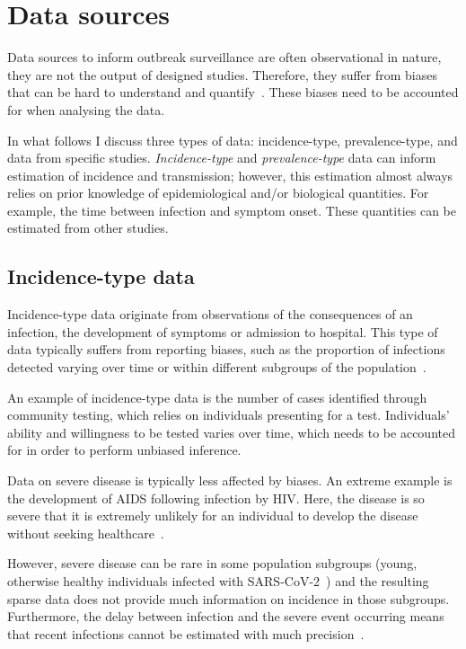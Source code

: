 \documentclass[thesis.tex]{subfiles}
\begin{document}
\section{Data sources}

Data sources to inform outbreak surveillance are often observational in nature, \ie they are not the output of designed studies.
Therefore, they suffer from biases that can be hard to understand and quantify~\autocite{shadboltChallenges}.
These biases need to be accounted for when analysing the data.

In what follows I discuss three types of data: incidence-type, prevalence-type, and data from specific studies.
\emph{Incidence-type} and \emph{prevalence-type} data can inform estimation of incidence and transmission; however, this estimation almost always relies on prior knowledge of epidemiological and/or biological quantities.
For example, the time between infection and symptom onset.
These quantities can be estimated from other studies.

\subsection{Incidence-type data}

Incidence-type data originate from observations of the consequences of an infection, \eg the development of symptoms or admission to hospital.
This type of data typically suffers from reporting biases, such as the proportion of infections detected varying over time or within different subgroups of the population~\autocites[chapter 9]{lashModern}{shadboltChallenges}.

An example of incidence-type data is the number of cases identified through community testing, which relies on individuals presenting for a test.
Individuals' ability and willingness to be tested varies over time, which needs to be accounted for in order to perform unbiased inference.

Data on severe disease is typically less affected by biases.
An extreme example is the development of AIDS following infection by HIV.
Here, the disease is so severe that it is extremely unlikely for an individual to develop the disease without seeking healthcare~\autocite{evansCompleteness}.

However, severe disease can be rare in some population subgroups (\eg young, otherwise healthy individuals infected with SARS-CoV-2~\autocite{wardSero,bhopalChildren}) and the resulting sparse data 
 does not provide much information on incidence in those subgroups.
Furthermore, the delay between infection and the severe event occurring means that recent infections cannot be estimated with much precision~\autocite{swallow2022challenges}.
\end{document}
